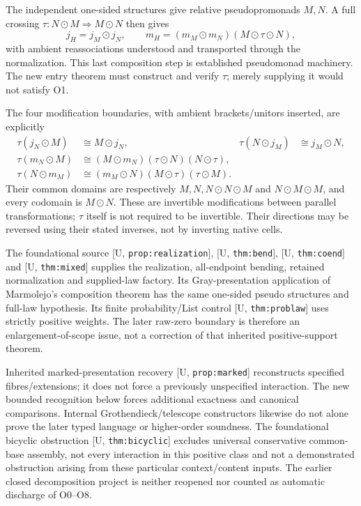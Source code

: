 \documentclass[11pt,a4paper]{article}
\theoremstyle{definition}
\newcommand{\Addr}[2]{\textup{[#1, \texttt{#2}]}}
\begin{document}
The independent one-sided structures give relative pseudopromonads
\(M,N\). A full crossing
\(\tau:N\odot M\Rightarrow M\odot N\) then gives
\begin{equation}\label{eq:mixed}
 j_H=j_M\odot j_N,\qquad
 m_H=(m_M\odot m_N)(M\odot\tau\odot N),
\end{equation}
with ambient reassociations understood and transported through the
normalization. This last composition step is established pseudomonad
machinery. The new entry theorem must construct and verify \(\tau\);
merely supplying it would not satisfy O1.

The four modification boundaries, with ambient brackets/unitors inserted,
are explicitly
\begin{align*}
 \tau(j_N\odot M)&\cong M\odot j_N,
 &\tau(N\odot j_M)&\cong j_M\odot N,\\
 \tau(m_N\odot M)&\cong(M\odot m_N)(\tau\odot N)(N\odot\tau),\\
 \tau(N\odot m_M)&\cong(m_M\odot N)(M\odot\tau)(\tau\odot M).
\end{align*}
Their common domains are respectively \(M,N,N\odot N\odot M\) and
\(N\odot M\odot M\), and every codomain is \(M\odot N\).
These are invertible modifications between parallel transformations;
\(\tau\) itself is not required to be invertible. Their directions may
be reversed using their stated inverses, not by inverting native cells.

The foundational source \Addr{U}{prop:realization}, \Addr{U}{thm:bend},
\Addr{U}{thm:coend} and \Addr{U}{thm:mixed} supplies the realization,
all-endpoint bending, retained normalization and supplied-law factory.
Its Gray-presentation application of Marmolejo's composition theorem has
the same one-sided pseudo structures and full-law hypothesis. Its finite
probability/List control \Addr{U}{thm:problaw} uses strictly positive
weights. The later raw-zero boundary is therefore an enlargement-of-scope
issue, not a correction of that inherited positive-support theorem.

Inherited marked-presentation recovery \Addr{U}{prop:marked} reconstructs
specified fibres/extensions; it does not force a previously unspecified
interaction. The new bounded recognition below forces additional exactness
and canonical comparisons. Internal Grothendieck/telescope constructors
likewise do not alone prove the later typed language or higher-order
soundness. The foundational bicyclic obstruction \Addr{U}{thm:bicyclic}
excludes universal conservative common-base assembly, not every interaction
in this positive class and not a demonstrated obstruction arising from
these particular context/content inputs. The earlier closed decomposition
project is neither reopened nor counted as automatic discharge of O0--O8.
\end{document}
